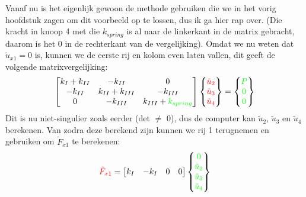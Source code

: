 \documentclass[a4paper,11pt,twoside]{report}
\begin{document}
Vanaf nu is het eigenlijk gewoon de methode gebruiken die we in het vorig hoofdstuk zagen om dit
voorbeeld op te lossen, dus ik ga hier rap over. (Die kracht in knoop 4 met die $k_{spring}$ is al
naar de linkerkant in de matrix gebracht, daarom is het 0 in de rechterkant van de vergelijking).
\newline
\newline
Omdat we nu weten dat $\tilde{u}_{x1} = 0$ is, kunnen we de eerste rij en kolom even laten vallen,
dit geeft de volgende matrixvergelijking:
\begin{align*}
    \begin{bmatrix}
        k_{I} + k_{II} & -k_{II}          & 0                                   \\
        -k_{II}        & k_{II} + k_{III} & -k_{III}                            \\
        0              & -k_{III}         & k_{III} + {\color{green}k_{spring}}
    \end{bmatrix}
    \begin{Bmatrix}
        {\color{red}\tilde{u}_{2}} \\
        {\color{red}\tilde{u}_{3}} \\
        {\color{red}\tilde{u}_{4}}
    \end{Bmatrix}
    =
    \begin{Bmatrix}
        {\color{green}P} \\
        {\color{green}0} \\
        {\color{green}0}
    \end{Bmatrix}
\end{align*}
Dit is nu niet-singulier zoals eerder (det $\neq$ 0), dus de computer kan $\tilde{u}_{2}$,
$\tilde{u}_{3}$ en $\tilde{u}_{4}$ berekenen.
\newline
\newline
Van zodra deze berekend zijn kunnen we rij 1 terugnemen en gebruiken om $\tilde{F}_{x1}$ te
berekenen:
\begin{align*}
    {\color{red}\tilde{F}_{x1}} =
    \begin{bmatrix}
        k_{I} & -k_{I} & 0 & 0
    \end{bmatrix}
    \begin{Bmatrix}
        {\color{green}0}             \\
        {\color{green}\tilde{u}_{2}} \\
        {\color{green}\tilde{u}_{3}} \\
        {\color{green}\tilde{u}_{4}}
    \end{Bmatrix}
\end{align*}
\end{document}
